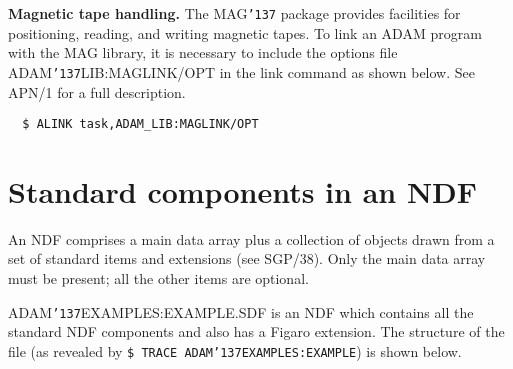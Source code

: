 \documentclass[twoside,11pt]{article}
\renewcommand{\_}{{\tt\char'137}}
\newcommand{\xref}[3]{#1}
\newcommand{\xlabel}[1]{}
\begin{document}
\begin{description}
\item{\bf Magnetic tape handling.}
The MAG\_ package provides facilities for positioning, reading, and writing
magnetic tapes.
To link an ADAM program with the MAG  library, it is necessary to
include the options file
ADAM\_LIB:MAGLINK/OPT in the link command as shown below.
See APN/1 for a full
description.
\begin{verbatim}
  $ ALINK task,ADAM_LIB:MAGLINK/OPT
\end{verbatim}

\end{description}
\newpage

\appendix
\section{Standard components in an NDF\label{apxndf}\xlabel{standard_components_in_an_ndf}}

An NDF comprises a main data array plus a collection of objects drawn from
a set of standard items and extensions (see \xref{SGP/38}{sgp38}{}).
Only the main data array must be present; all the other items are optional.

ADAM\_EXAMPLES:EXAMPLE.SDF is an NDF which contains all the standard
NDF components and also has a Figaro extension.
The structure of the file
(as revealed by {\tt \$ TRACE ADAM\_EXAMPLES:EXAMPLE}) is shown below.
\end{document}
